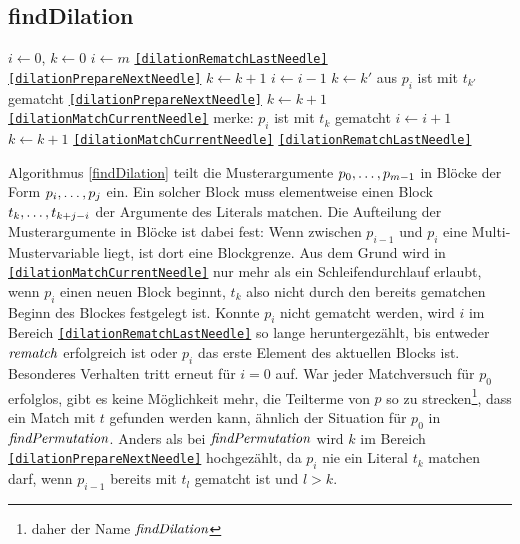 \subsection {findDilation}
\begin{algorithm}
\DontPrintSemicolon
\caption{$\Const{findDilation} \colon M \times T \times \mathit{Bool} \rightarrow \mathit{Bool}$}\label{findDilation}
\Let $i \leftarrow 0$, $k \leftarrow 0$\;
 {
	$i \leftarrow m$\;
	\Goto \texttt{\ref{dilationRematchLastNeedle}}\;
}
 {
}
 {
}
 \label{dilationMatchCurrentNeedle} 
 {
	 { 
		 {
			\Goto \texttt{\ref{dilationPrepareNextNeedle}}\;
		}
		$k \leftarrow k + 1$\;
	}
}
 \label{dilationRematchLastNeedle} 
 {
	$i \leftarrow i - 1$\;
	{$k \leftarrow k'$ aus \glqq $p_{i}$ ist mit $t_{k'}$ gematcht\grqq{}}\;
	 {
		\Goto \texttt{\ref{dilationPrepareNextNeedle}}\;
	}
	 {
		$k \leftarrow k + 1$\;
	\Goto \texttt{\ref{dilationMatchCurrentNeedle}}\;
	}
}
\;
 \label{dilationPrepareNextNeedle} 
merke: $p_i$ ist mit $t_k$ gematcht\;
$i \leftarrow i + 1$\;
$k \leftarrow k + 1$\;
 {
	\Goto \texttt{\ref{dilationMatchCurrentNeedle}}\;
}
 {
	\Goto \texttt{\ref{dilationRematchLastNeedle}}\;
}
\end{algorithm}


Algorithmus \ref{findDilation} teilt die Musterargumente ${p}_{0}, \dots, {p}_{m-1}$ in Blöcke der Form ${p}_{i}, \dots, {p}_{j}$ ein. Ein solcher Block muss elementweise einen Block ${t}_{k}, \dots, {t}_{k + j - i}$ der Argumente des Literals matchen. Die Aufteilung der Musterargumente in Blöcke ist dabei fest: Wenn zwischen $p_{i-1}$ und $p_{i}$ eine Multi-Mustervariable liegt, ist dort eine Blockgrenze. Aus dem Grund wird in \texttt{\ref{dilationMatchCurrentNeedle}} nur mehr als ein Schleifendurchlauf erlaubt, wenn $p_i$ einen neuen Block beginnt, $t_k$ also nicht durch den bereits gematchen Beginn des Blockes festgelegt ist. 
Konnte $p_i$ nicht gematcht werden, wird  $i$ im Bereich \texttt{\ref{dilationRematchLastNeedle}} so lange heruntergezählt, bis entweder $\mathit{rematch}$ erfolgreich ist oder $p_i$ das erste Element des aktuellen Blocks ist. Besonderes Verhalten tritt erneut für $i = 0$ auf. War jeder Matchversuch für $p_0$ erfolglos, gibt es keine Möglichkeit mehr, die Teilterme von $p$ so zu \glqq strecken\grqq{}\footnote{daher der Name $\mathit{findDilation}$}, dass ein Match mit $t$ gefunden werden kann, ähnlich der Situation für $p_0$ in $\mathit{findPermutation}$. Anders als bei $\mathit{findPermutation}$ wird $k$ im Bereich \texttt{\ref{dilationPrepareNextNeedle}} hochgezählt, da $p_i$ nie ein Literal $t_k$ matchen darf, wenn $p_{i-1}$ bereits mit $t_l$ gematcht ist und $l > k$.



